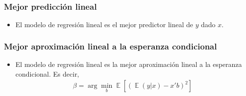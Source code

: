 \documentclass[t, compress, spanish, aspectratio=169]{beamer}
\DeclareMathOperator{\E}{\mathbb{E}}
\begin{document}
    \begin{frame}
        \frametitle{Mejor predicci\'on lineal}
        \begin{itemize}
            \item <1-> El modelo de regresi\'on lineal es el mejor predictor lineal de $y$ dado $x$.
        \end{itemize}
    \end{frame} 
   \begin{frame}
        \frametitle{Mejor aproximaci\'on lineal a la esperanza condicional}
        \begin{itemize}
            \item  El modelo de regresi\'on lineal es la mejor aproximaci\'on lineal a la esperanza condicional. Es decir,
            \begin{align*}
            \beta = \arg \min_b \E[(\E(y|x)-x'b)^2]
            \end{align*}
        \end{itemize}
    \end{frame} 
                
    
\end{document}
